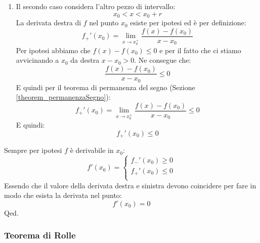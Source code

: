 {\begin{enumerate}
		\item Il secondo caso considera l'altro pezzo di intervallo:
			\begin{equation*}
				x_0< x < x_0 + r
			\end{equation*}
			La derivata destra di $f$ nel punto $x_0$ esiste per ipotesi ed è 
            per definizione:
			\begin{equation*}
				f_+'(x_0) = \lim_{x \to x_0^+}  \dfrac{f(x) - f(x_0)}{x-x_0}
			\end{equation*}
			Per ipotesi abbiamo che $f(x) - f(x_0) \leq 0$ e per il fatto che 
            ci stiamo avvicinando a $x_0$ da destra $x - x_0 > 0$. Ne consegue 
            che:
			\begin{equation*}
				\dfrac{f(x) - f(x_0)}{x-x_0} \leq 0
			\end{equation*}
			E quindi per il teorema di permanenza del segno (Sezione 
            \ref{theorem_permanenzaSegno}):
			\begin{equation*}
				f_+'(x_0) = \lim_{x \to x_0^+}  \dfrac{f(x) - f(x_0)}{x-x_0} 
                \leq 0
			\end{equation*}
			E quindi:
			\begin{equation*}
				f_+'(x_0) \leq 0
			\end{equation*}
	\end{enumerate}
	Sempre per ipotesi $f$ è derivabile in $x_0$:
	\begin{equation*}
		f'(x_0) =
		\begin{cases*}
			f_-' (x_0) \geq 0\\[10pt]
			f_+' (x_0) \leq 0\\
		\end{cases*}
	\end{equation*}
	Essendo che il valore della derivata destra e sinistra devono coincidere 
    per fare in modo che esista la derivata nel punto:
	\begin{equation*}
		f'(x_0) = 0
	\end{equation*}
	\hfill Qed.
}

\subsubsection{Teorema di Rolle} \label{sec_teoremaRolle}

